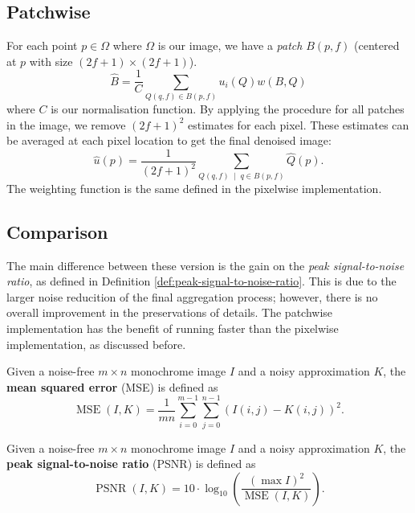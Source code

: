 \subsection{Patchwise}

For each point $p \in \Omega$ where $\Omega$ is our image, we have a \emph{patch} $B(p, f)$ 
(centered at $p$ with size $(2f + 1) \times (2f + 1)$).
\[ \hat B = \frac1C \sum_{Q(q,f) \in B(p, f)} u_i(Q) w(B, Q) \]
where $C$ is our normalisation function.
By applying the procedure for all patches in the image,
we remove $(2f + 1)^2$ estimates for each pixel.
These estimates can be averaged at each pixel location to get the final denoised image:
\[ \hat u(p) = \frac1{(2f + 1)^2} \sum_{Q(q, f) \;\mid\; q \in B(p, f)} \hat Q(p). \]
The weighting function is the same defined in the pixelwise implementation.

\subsection{Comparison}

The main difference between these version is the gain on the \emph{peak signal-to-noise ratio}, 
as defined in Definition \ref{def:peak-signal-to-noise-ratio}.
This is due to the larger noise reducition of the final aggregation process;
however, there is no overall improvement in the preservations of details.
The patchwise implementation has the benefit of running faster than the pixelwise
implementation, as discussed before.

\begin{definition}
    \label{def:mean-squared-error}
    Given a noise-free $m \times n$ monochrome image $I$ and a noisy approximation $K$, 
    the \textbf{mean squared error} (MSE) is defined as
    \[ \operatorname{MSE}{(I, K)} = 
    \frac1{mn} \sum_{i=0}^{m-1} \sum_{j=0}^{n-1} \left(I(i,j) - K(i,j)\right)^2. \]
\end{definition}

\begin{definition}
    \label{def:peak-signal-to-noise-ratio}
    Given a noise-free $m \times n$ monochrome image $I$ and a noisy approximation $K$,
    the \textbf{peak signal-to-noise ratio} (PSNR) is defined as
    \[ \operatorname{PSNR}{(I, K)} =
    10 \cdot \log_{10} \left(\frac{(\max{I})^2}{\operatorname{MSE}{(I, K)}}\right).\]
\end{definition}

